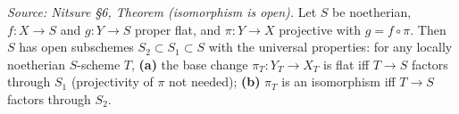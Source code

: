 \begin{theorem}
  \label{thm:isomorphism-is-open}
  \textit{Source: Nitsure §6, Theorem (isomorphism is open).}
  Let $S$ be noetherian, $f\colon X\to S$ and $g\colon Y\to S$ proper flat, and
  $\pi\colon Y\to X$ projective with $g = f\circ\pi$. Then $S$ has open
  subschemes $S_2\subset S_1\subset S$ with the universal properties: for any
  locally noetherian $S$-scheme $T$, \textbf{(a)} the base change
  $\pi_T\colon Y_T\to X_T$ is flat iff $T\to S$ factors through $S_1$ (projectivity
  of $\pi$ not needed); \textbf{(b)} $\pi_T$ is an isomorphism iff $T\to S$
  factors through $S_2$.
\end{theorem}

